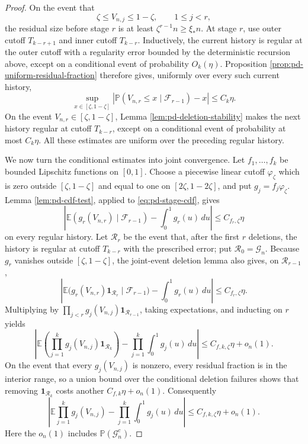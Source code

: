 \documentclass[11pt]{article}
\theoremstyle{remark}
\newcommand{\Pp}{\mathbb P}
\newcommand{\Ee}{\mathbb E}
\newcommand{\one}{\mathbf 1}
\newcommand{\dd}{\,d}
\begin{document}
\begin{proof}
On the event that
\[
        \zeta\le V_{n,j}\le1-\zeta,
        \qquad 1\le j<r,
 \tag{6.20}\label{eq:pd-interior-history}
\]
the residual size before stage $r$ is at least
$\zeta^{r-1}n\ge\xi_*n$.  At stage $r$, use outer cutoff
$T_{k-r+1}$ and inner cutoff $T_{k-r}$.  Inductively, the current history is
regular at the outer cutoff with a regularity error bounded by the deterministic
recursion above, except on a conditional event of probability $O_k(\eta)$.
Proposition \ref{prop:pd-uniform-residual-fraction} therefore gives, uniformly
over every such current history,
\begin{equation}
 \sup_{x\in[\zeta,1-\zeta]}
 \left|\Pp(V_{n,r}\le x\mid\mathscr F_{r-1})-x\right|
 \le C_k\eta.
 \label{eq:pd-stage-cdf}
\end{equation}
On the event $V_{n,r}\in[\zeta,1-\zeta]$, Lemma
\ref{lem:pd-deletion-stability} makes the next history regular at cutoff
$T_{k-r}$, except on a conditional event of probability at most $C_k\eta$.
All these estimates are uniform over the preceding regular history.

We now turn the conditional estimates into joint convergence.  Let
$f_1,\ldots,f_k$ be bounded Lipschitz functions on $[0,1]$.  Choose a piecewise
linear cutoff $\varphi_\zeta$ which is zero outside
$[\zeta,1-\zeta]$ and equal to one on
$[2\zeta,1-2\zeta]$, and put $g_j=f_j\varphi_\zeta$.  Lemma
\ref{lem:pd-cdf-test}, applied to \eqref{eq:pd-stage-cdf}, gives
\[
 \left|\Ee(g_r(V_{n,r})\mid\mathscr F_{r-1})
       -\int_0^1g_r(u)\dd u\right|
 \le C_{f_r,\zeta}\eta
\]
on every regular history.  Let $\mathcal R_r$ be the event that, after the
first $r$ deletions, the history is regular at cutoff $T_{k-r}$ with the
prescribed error; put $\mathcal R_0=\mathcal G_n$.  Because $g_r$ vanishes
outside $[\zeta,1-\zeta]$, the joint-event deletion lemma also gives, on
$\mathcal R_{r-1}$,
\[
 \left|\Ee\bigl(g_r(V_{n,r})\one_{\mathcal R_r}
       \mid\mathscr F_{r-1}\bigr)
       -\int_0^1g_r(u)\dd u\right|
 \le C_{f_r,\zeta}\eta.
\]
Multiplying by
$\prod_{j<r}g_j(V_{n,j})\one_{\mathcal R_{r-1}}$, taking expectations, and
inducting on $r$ yields
\[
 \left|\Ee\left(\prod_{j=1}^kg_j(V_{n,j})
        \one_{\mathcal R_k}\right)
       -\prod_{j=1}^k\int_0^1g_j(u)\dd u\right|
 \le C_{f,k,\zeta}\eta+o_n(1).
\]
On the event that every $g_j(V_{n,j})$ is nonzero, every residual fraction is
in the interior range, so a union bound over the conditional deletion failures
shows that removing $\one_{\mathcal R_k}$ costs another
$C_{f,k}\eta+o_n(1)$.  Consequently
\begin{equation}
 \left|\Ee\prod_{j=1}^kg_j(V_{n,j})
       -\prod_{j=1}^k\int_0^1g_j(u)\dd u\right|
 \le C_{f,k,\zeta}\eta+o_n(1).
 \label{eq:pd-truncated-product}
\end{equation}
Here the $o_n(1)$ includes $\Pp(\mathcal G_n^c)$.


\end{proof}
\end{document}
